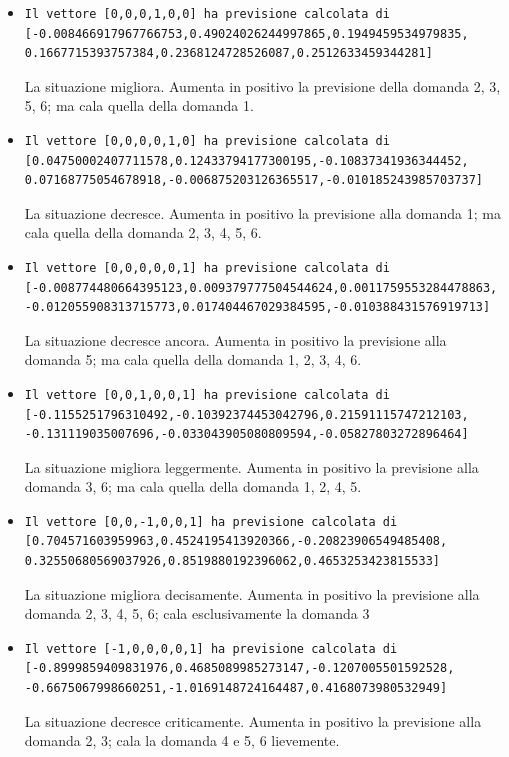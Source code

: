 \begin{itemize}
\item \begin{verbatim}Il vettore [0,0,0,1,0,0] ha previsione calcolata di
[-0.008466917967766753,0.49024026244997865,0.1949459534979835,
0.1667715393757384,0.2368124728526087,0.2512633459344281]
\end{verbatim}
La situazione migliora. Aumenta in positivo la previsione della domanda 2, 3, 5, 6; ma cala quella della domanda 1.

\item \begin{verbatim}Il vettore [0,0,0,0,1,0] ha previsione calcolata di
[0.04750002407711578,0.12433794177300195,-0.10837341936344452,
0.07168775054678918,-0.006875203126365517,-0.010185243985703737] 
\end{verbatim}
La situazione decresce. Aumenta in positivo la previsione alla domanda 1; ma cala quella della domanda 2, 3, 4, 5, 6.

\item \begin{verbatim}Il vettore [0,0,0,0,0,1] ha previsione calcolata di
[-0.008774480664395123,0.009379777504544624,0.0011759553284478863,
-0.012055908313715773,0.017404467029384595,-0.010388431576919713]
\end{verbatim}
La situazione decresce ancora. Aumenta in positivo la previsione alla domanda 5; ma cala quella della domanda 1, 2, 3, 4, 6.

\item \begin{verbatim}Il vettore [0,0,1,0,0,1] ha previsione calcolata di
[-0.1155251796310492,-0.10392374453042796,0.21591115747212103,
-0.131119035007696,-0.033043905080809594,-0.05827803272896464]
\end{verbatim}
La situazione migliora leggermente. Aumenta in positivo la previsione alla domanda 3, 6; ma cala quella della domanda 1, 2, 4, 5.

\item \begin{verbatim}Il vettore [0,0,-1,0,0,1] ha previsione calcolata di
[0.704571603959963,0.4524195413920366,-0.20823906549485408,
0.32550680569037926,0.8519880192396062,0.4653253423815533]
\end{verbatim}
La situazione migliora decisamente. Aumenta in positivo la previsione alla domanda 2, 3, 4, 5, 6;  cala esclusivamente la domanda 3

\item \begin{verbatim}Il vettore [-1,0,0,0,0,1] ha previsione calcolata di
[-0.8999859409831976,0.4685089985273147,-0.1207005501592528,
-0.6675067998660251,-1.0169148724164487,0.4168073980532949]
\end{verbatim}
La situazione decresce criticamente. Aumenta in positivo la previsione alla domanda 2, 3;  cala la domanda  4 e 5, 6 lievemente.


\end{itemize}
